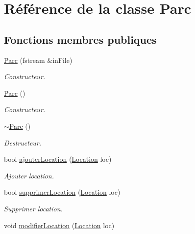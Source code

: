 \hypertarget{class_parc}{
\section{Référence de la classe Parc}
\label{class_parc}
}
\subsection*{Fonctions membres publiques}
\begin{DoxyCompactItemize}
\item 
\hyperlink{class_parc_ac974868bc248cc8ded2ac7c7d536251f}{Parc} (fstream \&inFile)
\begin{DoxyCompactList}\small\item\em Constructeur. \item\end{DoxyCompactList}\item 
\hyperlink{class_parc_ad7545bbf00b69b6bc47d8bc9e6584363}{Parc} ()
\begin{DoxyCompactList}\small\item\em Constructeur. \item\end{DoxyCompactList}\item 
\hyperlink{class_parc_a45de4ddcf862a8ad3da902bc63e0c1f6}{$\sim$Parc} ()
\begin{DoxyCompactList}\small\item\em Destructeur. \item\end{DoxyCompactList}\item 
bool \hyperlink{class_parc_a38f675f16195ff1a795d247d2ab2277c}{ajouterLocation} (\hyperlink{class_location}{Location} loc)
\begin{DoxyCompactList}\small\item\em Ajouter location. \item\end{DoxyCompactList}\item 
bool \hyperlink{class_parc_a9886186ab4182ee41a1480735600ed38}{supprimerLocation} (\hyperlink{class_location}{Location} loc)
\begin{DoxyCompactList}\small\item\em Supprimer location. \item\end{DoxyCompactList}\item 
void \hyperlink{class_parc_a4ce1969e29ebff5c149c7050e358e880}{modifierLocation} (\hyperlink{class_location}{Location} loc)

\end{DoxyCompactItemize}
